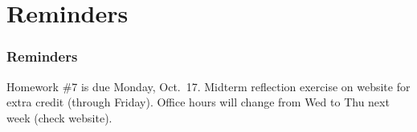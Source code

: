 \documentclass[11pt]{beamer}
\begin{document}
\section{Reminders}

\begin{frame}
  \frametitle{Reminders}
  \Enlarge

  \begin{itemize}
  \myitem  Homework \#7 is due Monday, Oct.\ 17.
  \myitem  Midterm reflection exercise on website for extra credit (through Friday).
  \myitem  Office hours will change from Wed to Thu next week (check website).
  \end{itemize}
\end{frame}
\end{document}
